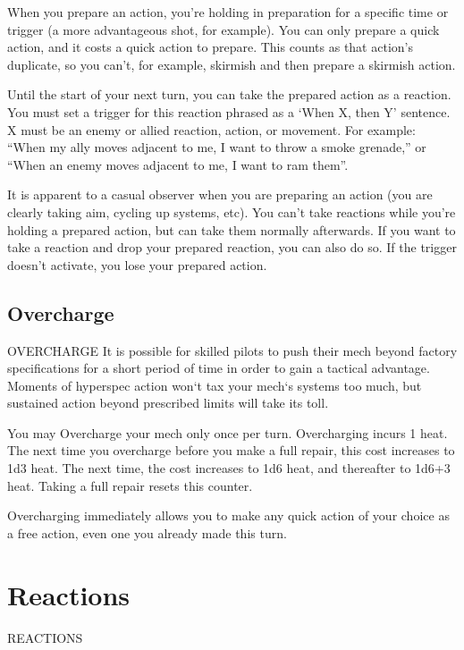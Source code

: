 When you prepare an action, you’re holding in preparation for a specific time or trigger (a more
advantageous shot, for example). You can only prepare a quick action, and it costs a quick
action to prepare. This counts as that action’s duplicate, so you can’t, for example, skirmish and
then prepare a skirmish action.


Until the start of your next turn, you can take the prepared action as a reaction. You must set a
trigger for this reaction phrased as a ‘When X, then Y’ sentence. X must be an enemy or allied
reaction, action, or movement. For example: “When my ally moves adjacent to me, I want to
throw a smoke grenade,” or “When an enemy moves adjacent to me, I want to ram them”.


It is apparent to a casual observer when you are preparing an action (you are clearly taking aim,
cycling up systems, etc). You can’t take reactions while you’re holding a prepared action, but can
take them normally afterwards. If you want to take a reaction and drop your prepared reaction,
you can also do so. If the trigger doesn’t activate, you lose your prepared action.

\subsection{Overcharge}
                                            OVERCHARGE
It is possible for skilled pilots to push their mech beyond factory specifications for a short period
of time in order to gain a tactical advantage. Moments of hyperspec action won‘t tax your
mech‘s systems too much, but sustained action beyond prescribed limits will take its toll.





You may Overcharge your mech only once per turn. Overcharging incurs 1 heat. The next time
you overcharge before you make a full repair, this cost increases to 1d3 heat. The next time, the
cost increases to 1d6 heat, and thereafter to 1d6+3 heat. Taking a full repair resets this counter.


Overcharging immediately allows you to make any quick action of your choice as a free
action, even one you already made this turn.

\section{Reactions}
                                        REACTIONS

